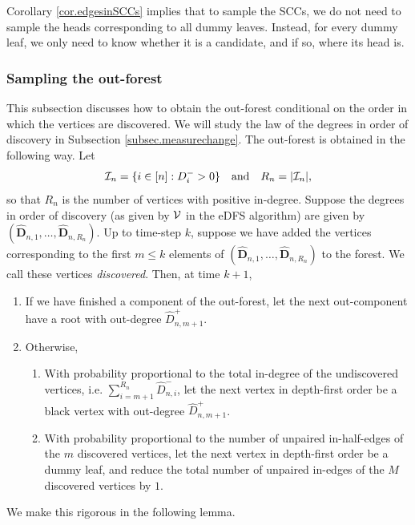Corollary \ref{cor.edgesinSCCs} implies that to sample the SCCs, we do not need to sample the heads corresponding to all dummy leaves. Instead, for every dummy leaf, we only need to know whether it is a candidate, and if so, where its head is. 
\subsubsection{Sampling the out-forest}\label{subsubsec.samplingoutforest}
This subsection discusses how to obtain the out-forest conditional on the order in which the vertices are discovered. We will study the law of the degrees in order of discovery in Subsection \ref{subsec.measurechange}. The out-forest is obtained in the following way. Let
\begin{equation*}
    {\mathcal I}_n = \{i \in [n]: D_i^- > 0\}
    \quad \text{and} \quad
    R_n = \lvert{\mathcal I}_n\rvert,
\end{equation*}
so that $R_n$ is the number of vertices with positive in-degree. Suppose the degrees in order of discovery (as given by $\mathcal V$ in the eDFS algorithm) are given by $(\mathbf{\hat{D}}_{n,1},\dots,\mathbf{\hat{D}}_{n, R_n})$. Up to time-step $k$, suppose we have added the vertices corresponding to the first $m\leq k$ elements of  $(\mathbf{\hat{D}}_{n,1},\dots,\mathbf{\hat{D}}_{n, R_n})$ to the forest. We call these vertices \emph{discovered}. Then, at time $k+1$,
\begin{enumerate}
    \item If we have finished a component of the out-forest, let the next out-component have a root with out-degree $\hat{D}_{n,m+1}^+$. 
    \item Otherwise,
    \begin{enumerate}\item With probability proportional to the total in-degree of the undiscovered vertices, i.e. $\sum_{i={m+1}}^{R_n} \hat{D}_{n,i}^-$, let the next vertex in depth-first order be a black vertex with out-degree $\hat{D}_{n,m+1}^+$. 
    \item With probability proportional to the number of unpaired in-half-edges of the $m$ discovered vertices, let the next vertex in depth-first order be a dummy leaf, and reduce the total number of unpaired in-edges of the $M$ discovered vertices by $1$.
\end{enumerate}
\end{enumerate}
We make this rigorous in the following lemma.
